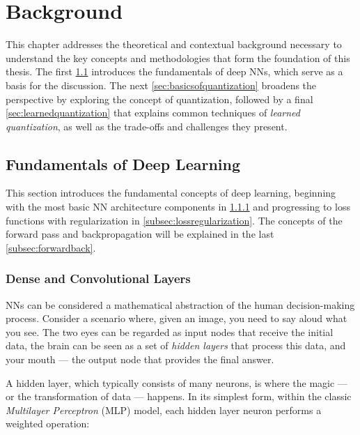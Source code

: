 \chapter{Background\label{cha:chapter2}}

\hspace*{1em}This chapter addresses the theoretical and contextual background 
necessary to understand the key concepts and methodologies 
that form the foundation of this thesis.
The first \cref{sec:deeplearning} introduces the fundamentals of deep NNs,
which serve as a basis for the discussion.
The next \cref{sec:basicsofquantization} broadens the perspective by exploring
the concept of quantization,
followed by a final \cref{sec:learnedquantization} that explains common techniques of \textit{learned quantization},
as well as the trade-offs and challenges they present.

\section{Fundamentals of Deep Learning}
\label{sec:deeplearning}
\hspace*{1em}This section introduces the fundamental concepts of deep learning, 
beginning with the most basic NN architecture components in \cref{subsec:denseconvolutional} and progressing to loss functions with regularization in \cref{subsec:lossregularization}. 
The concepts of the forward pass and backpropagation will be explained in the last \cref{subsec:forwardback}.

\subsection{Dense and Convolutional Layers}
\label{subsec:denseconvolutional}
\hspace*{1em}NNs can be considered a mathematical abstraction of the human decision-making process. 
Consider a scenario where, given an image, you need to say aloud what you see. 
The two eyes can be regarded as input nodes that receive the initial data, 
the brain can be seen as a set of \textit{hidden layers} that process this data, 
and your mouth — the output node that provides the final answer.

A hidden layer, which typically consists of many neurons, is where the magic
 — or the transformation of data — happens. In its simplest form, 
 within the classic \textit{Multilayer Perceptron} (MLP) model,
 each hidden layer neuron performs a weighted operation:

